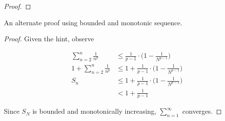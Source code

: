 \documentclass{tufte-book}
\theoremstyle{mytheoremstyle}
\theoremstyle{mylemstyle}
\theoremstyle{mydefstyle}
\begin{document}
\begin{enumerate}
\begin{proof}
\end{proof}

An alternate proof using bounded and monotonic sequence.

\begin{proof}

Given the hint, observe

\begin{align*}
\sum_{n=2}^n \frac{1}{n^p} &\leq \frac{1}{p-1} \cdot \Big( 1-\frac{1}{N^{p-1}}\Big)\\
1 + \sum_{n=2}^n \frac{1}{n^p} &\leq 1+\frac{1}{p-1} \cdot \Big( 1-\frac{1}{N^{p-1}}\Big)\\
S_n &\leq 1+\frac{1}{p-1} \cdot \Big( 1-\frac{1}{N^{p-1}}\Big)\\
&< 1 + \frac{1}{p-1}
\end{align*}

Since $S_N$ is bounded and monotonically increasing, $\sum_{n=1}^{\infty}$ converges.

\end{proof}

\end{enumerate}
\end{document}
